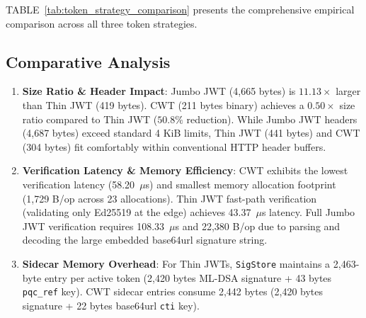 \documentclass[conference]{IEEEtran}
\begin{document}
TABLE~\ref{tab:token_strategy_comparison} presents the comprehensive empirical comparison across all three token strategies.

\begin{table}[htbp]
\caption{Comprehensive Token Strategy Trade-Off Matrix}
\label{tab:token_strategy_comparison}
\centering
{}
\end{table}

\subsection{Comparative Analysis}
\begin{enumerate}
    \item \textbf{Size Ratio \& Header Impact}: Jumbo JWT (4,665 bytes) is $11.13\times$ larger than Thin JWT (419 bytes). CWT (211 bytes binary) achieves a $0.50\times$ size ratio compared to Thin JWT ($50.8\%$ reduction). While Jumbo JWT headers (4,687 bytes) exceed standard 4 KiB limits, Thin JWT (441 bytes) and CWT (304 bytes) fit comfortably within conventional HTTP header buffers.
    \item \textbf{Verification Latency \& Memory Efficiency}: CWT exhibits the lowest verification latency (58.20~$\mu$s) and smallest memory allocation footprint (1,729 B/op across 23 allocations). Thin JWT fast-path verification (validating only Ed25519 at the edge) achieves 43.37~$\mu$s latency. Full Jumbo JWT verification requires 108.33~$\mu$s and 22,380 B/op due to parsing and decoding the large embedded base64url signature string.
    \item \textbf{Sidecar Memory Overhead}: For Thin JWTs, \texttt{SigStore} maintains a 2,463-byte entry per active token (2,420 bytes ML-DSA signature + 43 bytes \texttt{pqc\_ref} key). CWT sidecar entries consume 2,442 bytes (2,420 bytes signature + 22 bytes base64url \texttt{cti} key).
\end{enumerate}
\end{document}
